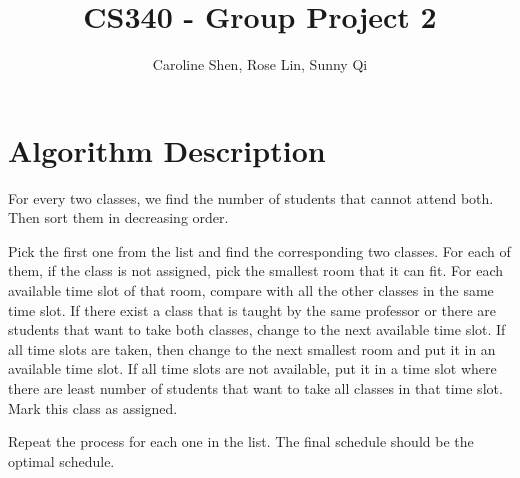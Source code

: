 \documentclass[11pt, oneside]{article}   	%
\title{CS340 - Group Project 2}
\author{Caroline Shen, Rose Lin, Sunny Qi}
\date{}							%
\begin{document}
\maketitle


\section{Algorithm Description}
For every two classes, we find the number of students that cannot attend both. Then sort them in decreasing order. 

Pick the first one from the list and find the corresponding two classes. For each of them, if the class is not assigned, pick the smallest room that it can fit. For each available time slot of that room, compare with all the other classes in the same time slot. If there exist a class that is taught by the same professor or there are students that want to take both classes, change to the next available time slot. If all time slots are taken, then change to the next smallest room and put it in an available time slot. If all time slots are not available, put it in a time slot where there are least number of students that want to take all classes in that time slot. Mark this class as assigned. 

Repeat the process for each one in the list. The final schedule should be the optimal schedule.

\section{}
\begin{algorithm}[H]
\end{algorithm}
\end{document}
